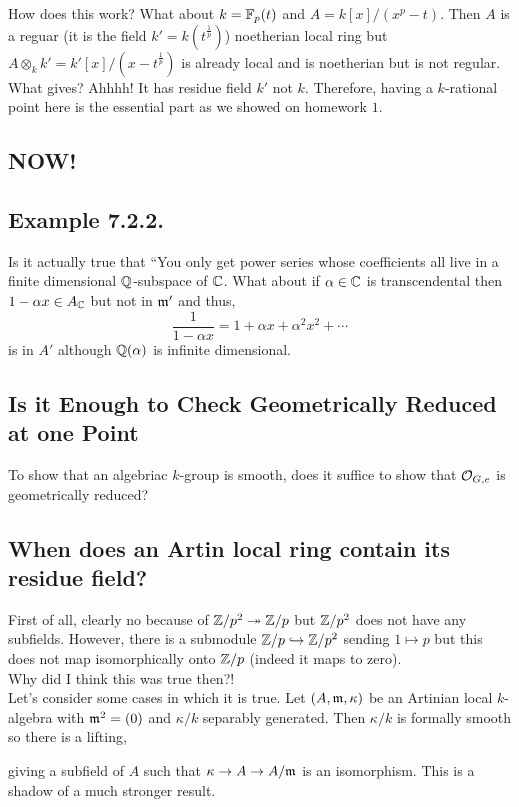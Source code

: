 \documentclass[12pt]{article}
\begin{document}
How does this work? What about $k = \mathbb{F}_p(t)$ and $A = k[x]/(x^p - t)$. Then $A$ is a reguar (it is the field $k' = k(t^{\frac{1}{p}})$) noetherian local ring but $A \otimes_k k' = k'[x]/(x - t^{\frac{1}{p}})$ is already local and is noetherian but is not regular. What gives? Ahhhh! It has residue field $k'$ not $k$. Therefore, having a $k$-rational point here is the essential part as we showed on homework $1$. 

\subsection{NOW!}

\subsection{Example 7.2.2.}

Is it actually true that ``You only get power series whose coefficients all live in a finite dimensional $\mathbb{Q}$-subspace of $\mathbb{C}$. What about if $\alpha \in \mathbb{C}$ is transcendental then $1 - \alpha x \in A_{\mathbb{C}}$ but not in $\mathfrak{m}'$ and thus,
\[ \frac{1}{1 - \alpha x} = 1 + \alpha x + \alpha^2 x^2 + \cdots \]
is in $A'$ although $\mathbb{Q}(\alpha)$ is infinite dimensional.

\subsection{Is it Enough to Check Geometrically Reduced at one Point}

To show that an algebriac $k$-group is smooth, does it suffice to show that $\mathcal{O}_{G, e}$ is geometrically reduced?

\subsection{When does an Artin local ring contain its residue field?}

First of all, clearly no because of $\mathbb{Z} / p^2 \twoheadrightarrow \mathbb{Z} / p$ but $\mathbb{Z} / p^2$ does not have any subfields. However, there is a submodule $\mathbb{Z} / p \hookrightarrow \mathbb{Z} / p^2$ sending $1 \mapsto p$ but this does not map isomorphically onto $\mathbb{Z} / p$ (indeed it maps to zero).
\bigskip\\
Why did I think this was true then?!
\bigskip\\
Let's consider some cases in which it is true. Let $(A, \mathfrak{m}, \kappa)$ be an Artinian local $k$-algebra with $\mathfrak{m}^2 = (0)$ and $\kappa / k$ separably generated. Then $\kappa / k$ is formally smooth so there is a lifting,
\begin{center}
\end{center}
giving a subfield of $A$ such that $\kappa \to A \to A / \mathfrak{m}$ is an isomorphism. This is a shadow of a much stronger result.
\end{document}
